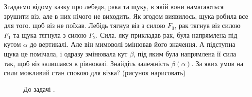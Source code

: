 \begin{problem}{10}
	Згадаємо відому казку про лебедя, рака та щуку, в якій вони намагаються зрушити віз, але в них нічого не виходить. Як згодом виявилось, щука робила все для того. щоб віз не поїхав. Лебідь тягнув віз з силою $F_0$, рак тягнув віз  силою $F_1$ та щука тягнула з силою $F_2$. Сила. яку прикладав рак, була напрямлена під кутом $\alpha $ до вертикалі. Але він мимоволі змінював його значення. А підступна щука це помічала, і одразу змінювала кут $\beta$, під яким була напрямлена її сила так, щоб віз залишався в рівновазі. Знайдіть залежність $\beta(\alpha)$. За яких умов на сили можливий стан спокою для візка? (рисунок нарисовать)
	
	\begin{figure}[h!]
		\centering
		\caption{До задачі .}
		\label{fairytale}
	\end{figure}
\end{problem}